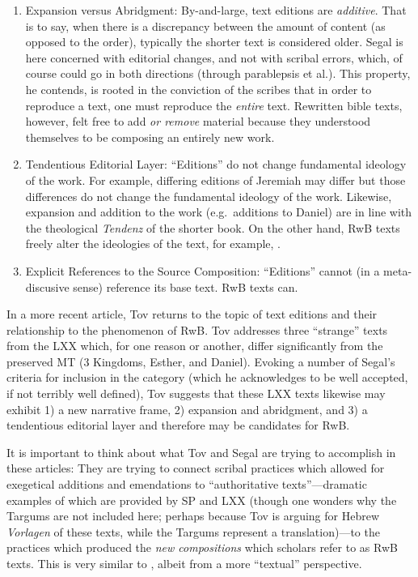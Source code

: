  \begin{enumerate} \def\labelenumi{\arabic{enumi}.} \setcounter{enumi}{3} \item   Expansion versus Abridgment: By-and-large, text editions are   \emph{additive}. That is to say, when there is a discrepancy between   the amount of content (as opposed to the order), typically the shorter   text is considered older. Segal is here concerned with editorial   changes, and not with scribal errors, which, of course could go in   both directions (through parablepsis et al.). This property, he   contends, is rooted in the conviction of the scribes that in order to   reproduce a text, one must reproduce the \emph{entire}   text.\autocite[24]{segal_henze2005} Rewritten bible texts, however,   felt free to add \emph{or remove} material because they understood   themselves to be composing an entirely new   work.\autocite[24]{segal_henze2005} \item   Tendentious Editorial Layer: ``Editions'' do not change fundamental   ideology of the work. For example, differing editions of Jeremiah may   differ but those differences do not change the fundamental ideology of   the work. Likewise, expansion and addition to the work (e.g.~additions   to Daniel) are in line with the theological \emph{Tendenz} of the   shorter book. On the other hand, RwB texts freely alter the ideologies   of the text, for example,   \jub.\autocite[25]{segal_henze2005} \item   Explicit References to the Source Composition: ``Editions'' cannot (in   a meta-discusive sense) reference its base text. RwB texts can. \end{enumerate} 

 In a more recent article, Tov returns to the topic of text editions and their relationship to the phenomenon of RwB\autocite{tov_krarrer-kraus2008}. Tov addresses three ``strange'' texts from the LXX which, for one reason or another, differ significantly from the preserved MT (3 Kingdoms, Esther, and Daniel). Evoking a number of Segal's criteria\autocite{segal_henze2005} for inclusion in the category (which he acknowledges to be well accepted, if not terribly well defined), Tov suggests that these LXX texts likewise may exhibit 1) a new narrative frame, 2) expansion and abridgment, and 3) a tendentious editorial layer and therefore may be candidates for RwB. 

 It is important to think about what Tov and Segal are trying to accomplish in these articles: They are trying to connect scribal practices which allowed for exegetical additions and emendations to ``authoritative texts''---dramatic examples of which are provided by SP and LXX (though one wonders why the Targums are not included here; perhaps because Tov is arguing for Hebrew \emph{Vorlagen} of these texts, while the Targums represent a translation)---to the practices which produced the \emph{new compositions} which scholars refer to as RwB texts. This is very similar to \vermes, albeit from a more ``textual'' perspective. 


